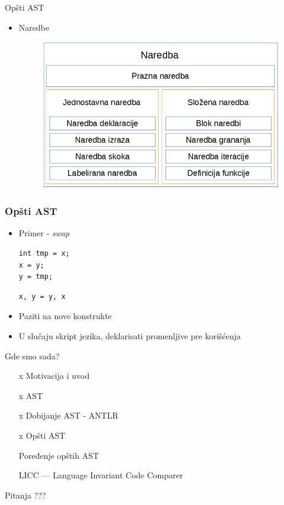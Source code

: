 \documentclass{beamer}
\begin{document}
\begin{frame}{Op\v{s}ti AST}
    \begin{itemize}
        \item Naredbe
        \begin{figure}[h!]
            \centering
            \includegraphics[scale=0.5]{images/statement_nodes.png}
        \end{figure}
    \end{itemize}
\end{frame}

\begin{frame}[fragile]
\frametitle{Op\v{s}ti AST}
    \begin{itemize}
        \item Primer - \emph{swap}
\begin{lstlisting}
int tmp = x;
x = y;
y = tmp;
\end{lstlisting}
\begin{lstlisting}
x, y = y, x
\end{lstlisting}
        \item Paziti na nove konstrukte
        \item U slu\v{c}aju skript jezika, deklarisati promenljive pre kori\v{s}\'c{}enja
    \end{itemize}
\end{frame}


\begin{frame}{Gde smo sada?}
    \begin{itemize}
        \item [x] Motivacija i uvod 
        \item [x] AST
        \item [x] Dobijanje AST - ANTLR
        \item [x] Op\v{s}ti AST
        \item [ ] Poređenje op\v{s}tih AST
        \item [ ] LICC --- Language Invariant Code Comparer
    \end{itemize}
\end{frame}


\begin{frame}{Pitanja}
    \centering
    ???
\end{frame}
\end{document}
